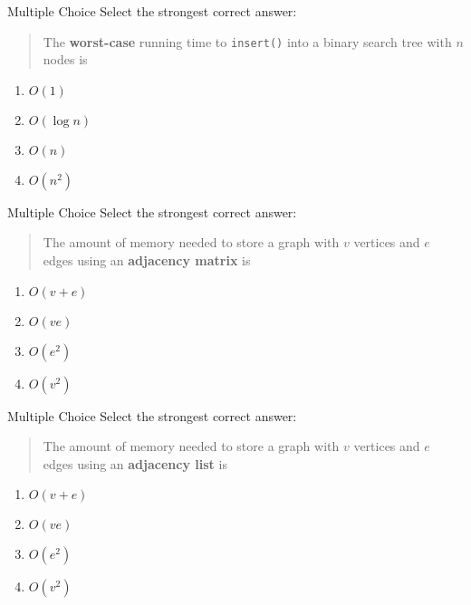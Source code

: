 \documentclass[9pt]{beamer}
\begin{document}
\begin{frame}[fragile]{Multiple Choice}
  Select the strongest correct answer:

  \begin{quote}
    The {\bf worst-case} running time to {\tt insert()} into a binary search
    tree with $n$ nodes is
  \end{quote}

  \begin{enumerate}
    \item
      $O(1)$
    \item
      $O(\log{n})$
    \item
      \alert<2->{$O(n)$}
    \item
      $O(n^2)$
  \end{enumerate}
\end{frame}

\begin{frame}[fragile]{Multiple Choice}
  Select the strongest correct answer:

  \begin{quote}
    The amount of memory needed to store a graph with $v$ vertices and $e$
    edges using an {\bf adjacency matrix} is
  \end{quote}

  \begin{enumerate}
    \item
      $O(v+e)$
    \item
      $O(ve)$
    \item
      $O(e^2)$
    \item
      \alert<2>{$O(v^2)$}
  \end{enumerate}
\end{frame}

\begin{frame}[fragile]{Multiple Choice}
  Select the strongest correct answer:

  \begin{quote}
    The amount of memory needed to store a graph with $v$ vertices and $e$
    edges using an {\bf adjacency list} is
  \end{quote}

  \begin{enumerate}
    \item
      \alert<2>{$O(v+e)$}
    \item
      $O(ve)$
    \item
      $O(e^2)$
    \item
      $O(v^2)$
  \end{enumerate}
\end{frame}
\end{document}

